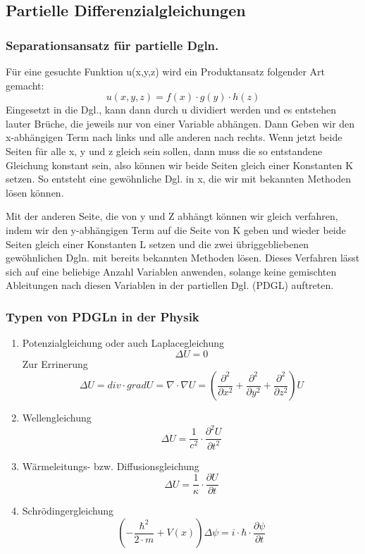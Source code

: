 \documentclass[
	11pt, %
]{beamer}
\begin{document}
\subsection{Partielle Differenzialgleichungen}
\begin{frame}
	\frametitle{Separationsansatz f\"ur partielle Dgln.}
	F\"ur eine gesuchte Funktion u(x,y,z) wird ein Produktansatz folgender Art gemacht:
		\begin{equation}
			u(x,y,z) = f(x)\cdot g(y)\cdot h(z)
		\end{equation}
		Eingesetzt in die Dgl., kann dann durch u dividiert werden und es entstehen lauter Br\"uche, die jeweils nur von einer Variable abh\"angen. Dann Geben wir den x-abh\"angigen Term nach links und alle anderen nach rechts. Wenn jetzt beide Seiten f\"ur alle x, y und z gleich sein sollen, dann muss die so entstandene Gleichung konstant sein, also k\"onnen wir beide Seiten gleich einer Konstanten K setzen. So entsteht eine gew\"ohnliche Dgl. in x, die wir mit bekannten Methoden l\"osen k\"onnen.
\end{frame}
\begin{frame}
    Mit der anderen Seite, die von y und Z abh\"angt k\"onnen wir gleich verfahren, indem wir den y-abh\"angigen Term auf die Seite von K geben und wieder beide Seiten gleich einer Konstanten L setzen und die zwei \"ubriggebliebenen gew\"ohnlichen Dgln. mit bereits bekannten Methoden l\"osen. Dieses Verfahren l\"asst sich auf eine beliebige Anzahl Variablen anwenden, solange keine gemischten Ableitungen nach diesen Variablen in der partiellen Dgl. (PDGL) auftreten.
\end{frame}
\begin{frame}
	\frametitle{Typen von PDGLn in der Physik}
	\begin{enumerate}	
		\item Potenzialgleichung oder auch Laplacegleichung
			\begin{equation}
				\Delta U = 0
			\end{equation}
			Zur Errinerung
			\begin{equation}
				\Delta U = div \cdot grad U = \nabla \cdot \nabla U = \left( \frac{\partial^2}{\partial x^2}+\frac{\partial^2}{\partial y^2}+\frac{\partial^2}{\partial z^2}\right)U
			\end{equation}
		\item Wellengleichung
			\begin{equation}
				\Delta U = \frac{1}{c^2}\cdot \frac{\partial^2 U}{\partial t^2}
			\end{equation}
		\item W\"armeleitungs- bzw. Diffusionsgleichung
			\begin{equation}
				\Delta U = \frac{1}{\kappa}\cdot \frac{\partial U}{\partial t}
			\end{equation}
		\item Schr\"odingergleichung
			\begin{equation}
				\left(- \frac{\hbar^2}{2\cdot m} + V(x)\right) \Delta \psi = i\cdot \hbar \cdot \frac{\partial \psi}{\partial t}
			\end{equation}
	\end{enumerate}	
\end{frame}
\end{document}
